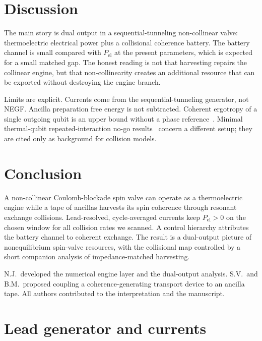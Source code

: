 \documentclass[aps,pre,twocolumn,floatfix,groupedaddress,amsmath,amssymb,nofootinbib]{revtex4-2}
\begin{document}
\section{Discussion}

The main story is dual output in a sequential-tunneling non-collinear
valve: thermoelectric electrical power plus a collisional coherence battery.
The battery channel is small compared with $P_{\mathrm{el}}$ at the present
parameters, which is expected for a small matched gap. The honest reading is
not that harvesting repairs the collinear engine, but that non-collinearity
creates an additional resource that can be exported without destroying the
engine branch.

Limits are explicit. Currents come from the sequential-tunneling generator,
not NEGF. Ancilla preparation free energy is not subtracted. Coherent
ergotropy of a single outgoing qubit is an upper bound without a phase
reference~\cite{Lostaglio2015}. Minimal thermal-qubit repeated-interaction
no-go results~\cite{NoGo2026} concern a different setup; they are cited only
as background for collision models.

\section{Conclusion}

A non-collinear Coulomb-blockade spin valve can operate as a thermoelectric
engine while a tape of ancillas harvests its spin coherence through resonant
exchange collisions. Lead-resolved, cycle-averaged currents keep
$P_{\mathrm{el}}>0$ on the chosen window for all collision rates we scanned.
A control hierarchy attributes the battery channel to coherent exchange.
The result is a dual-output picture of nonequilibrium spin-valve resources,
with the collisional map controlled by a short companion analysis of
impedance-matched harvesting.

\begin{acknowledgments}
N.J.\ developed the numerical engine layer and the dual-output analysis.
S.V.\ and B.M.\ proposed coupling a coherence-generating transport device to
an ancilla tape. All authors contributed to the interpretation and the
manuscript.
\end{acknowledgments}

\appendix

\section{Lead generator and currents}
\label{app:leads}
\end{document}
